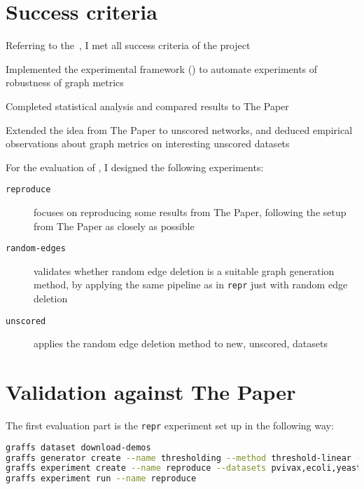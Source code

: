 \section{Success criteria}

Referring to the~, I met all success criteria of the project


\begin{todolist}
    \item[\done] Implemented the experimental framework (\graffs) to automate experiments of robustness of graph metrics
    \item[\done] Completed statistical analysis and compared results to The Paper
    \item[\done] Extended the idea from The Paper to unscored networks, and deduced empirical observations about graph metrics on interesting unscored datasets
\end{todolist}

For the evaluation of \graffs, I designed the following experiments:
\begin{description}
    \item[\texttt{reproduce}] focuses on reproducing some results from The Paper, following the setup from The Paper as closely as possible
    \item[\texttt{random-edges}] validates whether random edge deletion is a suitable graph generation method, by applying the same pipeline as in \texttt{repr} just with random edge deletion
    \item[\texttt{unscored}] applies the random edge deletion method to new, unscored, datasets
\end{description}


\section{Validation against The Paper}

The first evaluation part is the \texttt{repr} experiment set up in the following way:

\begin{lstlisting}[language=bash,style=light]
graffs dataset download-demos
graffs generator create --name thresholding --method threshold-linear --params 150,990 -n 85 --seed 5692472407974226435
graffs experiment create --name reproduce --datasets pvivax,ecoli,yeast --generator thresholding --metrics Betweenness,Degree,Ego1Edges,Ego2Nodes,EgoRatio,LocalClustering,PageRank,Redundancy --robustnessMeasures RankIdentifiability,RankInstability,RankContinuity
graffs experiment run --name reproduce
\end{lstlisting}

